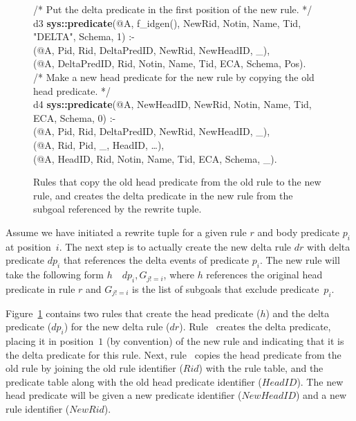 \begin{figure}[!t]
\ssp
\centering
\begin{boxedminipage}{\linewidth}
/* Put the delta predicate in the first position of the new rule. */ \\
d3 {\bf sys::predicate}(@A, f\_idgen(), NewRid, Notin, Name, Tid, "DELTA", Schema, 1) :- \\
(@A, Pid, Rid, DeltaPredID, NewRid, NewHeadID, \_), \\
(@A, DeltaPredID, Rid, Notin, Name, Tid, ECA, Schema, Pos). \\

/* Make a new head predicate for the new rule by copying the old head predicate. */ \\
d4 {\bf sys::predicate}(@A, NewHeadID, NewRid, Notin, Name, Tid, ECA, Schema, 0) :- \\
(@A, Pid, Rid, DeltaPredID, NewRid, NewHeadID, \_), \\
(@A, Rid, Pid, \_, HeadID, \ldots), \\
(@A, HeadID, Rid, Notin, Name, Tid, ECA, Schema, \_).

\end{boxedminipage}
\caption{\label{ch:evita:fig:delta2}Rules that copy the old head predicate from the old rule
to the new rule, and creates the delta predicate in the new rule from the subgoal referenced
by the rewrite tuple.}
\end{figure}

Assume we have initiated a rewrite tuple for a given rule $r$ and body
predicate $p_i$ at position~$i$.  The next step is to actually create the new
delta rule $dr$ with delta predicate $dp_i$ that references the delta events of
predicate $p_i$.  The new rule will take the following form $h$~\ol{:-}~$dp_i, G_{j!=i}$,
where $h$ references the original head predicate in rule $r$ and $G_{j!=i}$ is the list
of subgoals that exclude predicate~$p_i$.

Figure~\ref{ch:evita:fig:delta2} contains two rules that create the head
predicate ($h$) and the delta predicate ($dp_i$) for the new delta rule ($dr$).
Rule~ creates the delta predicate, placing it in position~$1$ (by
convention) of the new rule and indicating that it is the delta predicate for
this rule.  Next, rule~ copies the head predicate from the old rule by
joining the old rule identifier ($Rid$) with the rule table, and the predicate
table along with the old head predicate identifier ($HeadID$).  The new head
predicate will be given a new predicate identifier ($NewHeadID$) and a new rule
identifier ($NewRid$).


